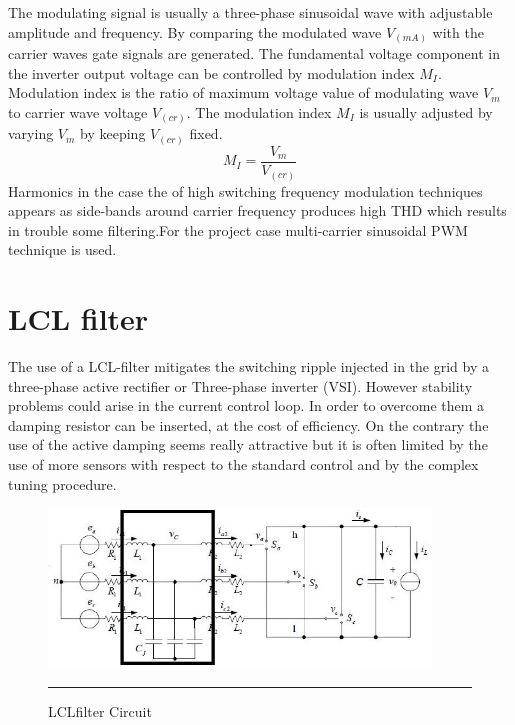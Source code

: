 The modulating signal is usually a three-phase sinusoidal wave
with adjustable amplitude and frequency. By comparing the
modulated wave $V_(mA)$ with the carrier waves gate signals are
generated.
 The fundamental voltage component in the inverter output
voltage can be controlled by modulation index $M_I$. Modulation index
is the ratio of maximum voltage value of modulating wave $V_m$ to
carrier wave voltage $V_(cr)$.
The modulation index $M_I$ is usually adjusted by varying $V_m$ by
keeping $V_(cr)$ fixed.
$$M_I=\frac{V_m}{V_(cr)}$$
Harmonics in the case the of high switching
frequency modulation techniques appears as side-bands around
carrier frequency produces high THD which results in trouble some
filtering.For the project case multi-carrier sinusoidal PWM technique is used.
\section{LCL filter}
The use of a LCL-filter mitigates the switching ripple injected in the grid by a three-phase
active rectifier or Three-phase inverter (VSI). However stability problems could arise in the
current control loop. In order to overcome them a damping resistor can be inserted, at the cost of
efficiency. On the contrary the use of the active damping seems really attractive but it is often
limited by the use of more sensors with respect to the standard control and by the complex tuning
procedure.
\begin{figure}[htbp]
	\centering
		\includegraphics[width = 4in]{./Figures/LCLfilter.jpg}
		\rule{35em}{5pt}
	\caption{LCLfilter Circuit}
	\label{fig:1}
\end{figure}